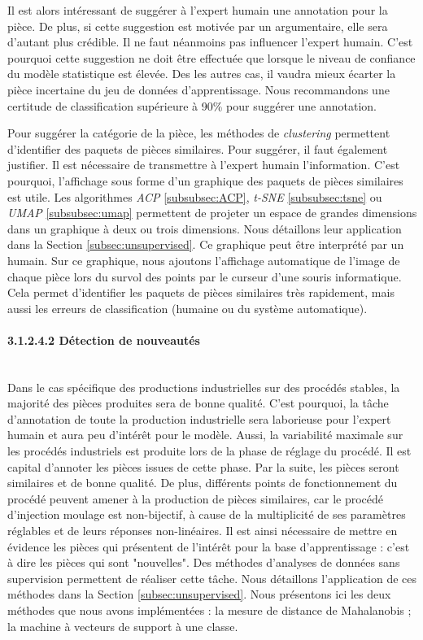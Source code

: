 Il est alors intéressant de suggérer à l'expert humain une annotation pour la pièce.
De plus, si cette suggestion est motivée par un argumentaire, elle sera d'autant plus crédible.
Il ne faut néanmoins pas influencer l'expert humain.
C'est pourquoi cette suggestion ne doit être effectuée que lorsque le niveau de confiance du modèle statistique est élevée.
Des les autres cas, il vaudra mieux écarter la pièce incertaine du jeu de données d'apprentissage.
Nous recommandons une certitude de classification supérieure à 90\% pour suggérer une annotation.

Pour suggérer la catégorie de la pièce, les méthodes de \textit{clustering} permettent d'identifier des paquets de pièces similaires.
Pour suggérer, il faut également justifier.
Il est nécessaire de transmettre à l'expert humain l'information.
C'est pourquoi, l'affichage sous forme d'un graphique des paquets de pièces similaires est utile.
Les algorithmes \textit{ACP} \ref{subsubsec:ACP}, \textit{t-SNE} \ref{subsubsec:tsne} ou \textit{UMAP} \ref{subsubsec:umap} permettent de projeter un espace de grandes dimensions dans un graphique à deux ou trois dimensions.
Nous détaillons leur application dans la Section \ref{subsec:unsupervised}.
Ce graphique peut être interprété par un humain.
Sur ce graphique, nous ajoutons l'affichage automatique de l'image de chaque pièce lors du survol des points par le curseur d'une souris informatique.
Cela permet d'identifier les paquets de pièces similaires très rapidement, mais aussi les erreurs de classification (humaine ou du système automatique).


\paragraph{3.1.2.4.2 Détection de nouveautés}\mbox{} \\
Dans le cas spécifique des productions industrielles sur des procédés stables, la majorité des pièces produites sera de bonne qualité.
C'est pourquoi, la tâche d'annotation de toute la production industrielle sera laborieuse pour l'expert humain et aura peu d'intérêt pour le modèle.
Aussi, la variabilité maximale sur les procédés industriels est produite lors de la phase de réglage du procédé.
Il est capital d'annoter les pièces issues de cette phase.
Par la suite, les pièces seront similaires et de bonne qualité.
De plus, différents points de fonctionnement du procédé peuvent amener à la production de pièces similaires, car le procédé d'injection moulage est non-bijectif, à cause de la multiplicité de ses paramètres réglables et de leurs réponses non-linéaires.
Il est ainsi nécessaire de mettre en évidence les pièces qui présentent de l'intérêt pour la base d'apprentissage : c'est à dire les pièces qui sont "nouvelles".
Des méthodes d'analyses de données sans supervision permettent de réaliser cette tâche.
Nous détaillons l'application de ces méthodes dans la Section \ref{subsec:unsupervised}.
Nous présentons ici les deux méthodes que nous avons implémentées : la mesure de distance de Mahalanobis ; la machine à vecteurs de support à une classe.

